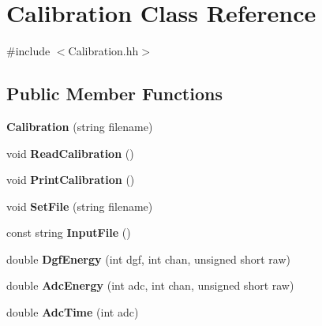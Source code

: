 \hypertarget{class_calibration}{}\section{Calibration Class Reference}
\label{class_calibration}


{\ttfamily \#include $<$Calibration.\+hh$>$}

\subsection*{Public Member Functions}
\begin{DoxyCompactItemize}
\item 
\mbox{\label{class_calibration_a8ac7c98e774549cbf0db954983c118cc}} 
{\bfseries Calibration} (string filename)
\item 
\mbox{\label{class_calibration_ad675a1c74ecd23e3af37fcffdeeed246}} 
void {\bfseries Read\+Calibration} ()
\item 
\mbox{\label{class_calibration_af224d188d64080db8d14eb0ddbb909f7}} 
void {\bfseries Print\+Calibration} ()
\item 
\mbox{\label{class_calibration_a8fe1671f5fa525d684b75f381b680f50}} 
void {\bfseries Set\+File} (string filename)
\item 
\mbox{\label{class_calibration_a10affa676c2fb505d3075d23c3bf0157}} 
const string {\bfseries Input\+File} ()
\item 
\mbox{\label{class_calibration_a0ea90a9b417ec5e50312b4bba2875f70}} 
double {\bfseries Dgf\+Energy} (int dgf, int chan, unsigned short raw)
\item 
\mbox{\label{class_calibration_a07ba44fdc31250e347939588759d2796}} 
double {\bfseries Adc\+Energy} (int adc, int chan, unsigned short raw)
\item 
\mbox{\label{class_calibration_a860b3c2c4a2350009bbbf337aa56a212}} 
double {\bfseries Adc\+Time} (int adc)
\item 
\mbox{\label{class_calibration_af66b845428db545238c5a49d5edadccd}} 

\end{DoxyCompactItemize}
